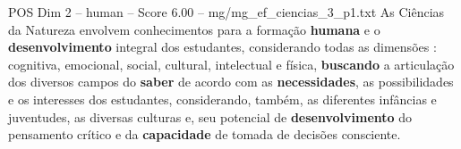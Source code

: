 \begin{textsample}{POS Dim 2 – human – Score 6.00 – mg/mg\_ef\_ciencias\_3\_p1.txt}  \label{ex:f2_pos_015}
As Ciências da Natureza envolvem conhecimentos para a formação \textbf{humana} e o \textbf{desenvolvimento} integral dos estudantes, considerando todas as dimensões : cognitiva, emocional, social, cultural, intelectual e física, \textbf{buscando} a articulação dos diversos campos do \textbf{saber} de acordo com as \textbf{necessidades}, as possibilidades e os interesses dos estudantes, considerando, também, as diferentes infâncias e juventudes, as diversas culturas e, seu potencial de \textbf{desenvolvimento} do pensamento crítico e da \textbf{capacidade} de tomada de decisões consciente.

\end{textsample}
